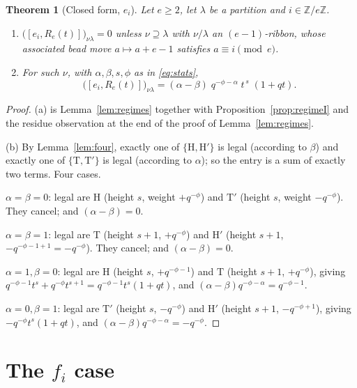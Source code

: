 \documentclass[11pt]{article}
\theoremstyle{plain}
\newtheorem{theorem}{Theorem}
\theoremstyle{definition}
\newcommand{\Z}{\mathbb{Z}}
\begin{document}
\begin{theorem}[Closed form, $e_i$]\label{thm:main-e}
Let $e\ge2$, let $\lambda$ be a partition and $i\in\Z/e\Z$.
\begin{enumerate}
\item[\rm(a)] $\big([e_i,R_e(t)]\big)_{\nu\lambda}=0$ unless $\nu\supseteq\lambda$
with $\nu/\lambda$ an $(e-1)$-ribbon, whose associated bead move
$a\mapsto a+e-1$ satisfies $a\equiv i\pmod e$.
\item[\rm(b)] For such $\nu$, with $\alpha,\beta,s,\phi$ as in \eqref{eq:stats},
\[
\boxed{\ \big([e_i,R_e(t)]\big)_{\nu\lambda}
=(\alpha-\beta)\;q^{-\phi-\alpha}\;t^{\,s}\;(1+qt).\ }
\]
\end{enumerate}
\end{theorem}

\begin{proof}
(a) is Lemma~\ref{lem:regimes} together with Proposition~\ref{prop:regimeI} and
the residue observation at the end of the proof of Lemma~\ref{lem:regimes}.

(b) By Lemma~\ref{lem:four}, exactly one of $\{\mathrm H,\mathrm H'\}$ is legal
(according to $\beta$) and exactly one of $\{\mathrm T,\mathrm T'\}$ is legal
(according to $\alpha$); so the entry is a sum of exactly two terms. Four cases.

$\alpha=\beta=0$: legal are $\mathrm H$ (height $s$, weight $+q^{-\phi}$) and
$\mathrm T'$ (height $s$, weight $-q^{-\phi}$). They cancel; and
$(\alpha-\beta)=0$. \checkmark

$\alpha=\beta=1$: legal are $\mathrm T$ (height $s+1$, $+q^{-\phi}$) and
$\mathrm H'$ (height $s+1$, $-q^{-\phi-1+1}=-q^{-\phi}$). They cancel; and
$(\alpha-\beta)=0$. \checkmark

$\alpha=1,\beta=0$: legal are $\mathrm H$ (height $s$, $+q^{-\phi-1}$) and
$\mathrm T$ (height $s+1$, $+q^{-\phi}$), giving
$q^{-\phi-1}t^s+q^{-\phi}t^{s+1}=q^{-\phi-1}t^s(1+qt)$, and
$(\alpha-\beta)q^{-\phi-\alpha}=q^{-\phi-1}$. \checkmark

$\alpha=0,\beta=1$: legal are $\mathrm T'$ (height $s$, $-q^{-\phi}$) and
$\mathrm H'$ (height $s+1$, $-q^{-\phi+1}$), giving
$-q^{-\phi}t^s(1+qt)$, and $(\alpha-\beta)q^{-\phi-\alpha}=-q^{-\phi}$. \checkmark
\end{proof}

\section{The $f_i$ case}\label{sec:f}
\end{document}
